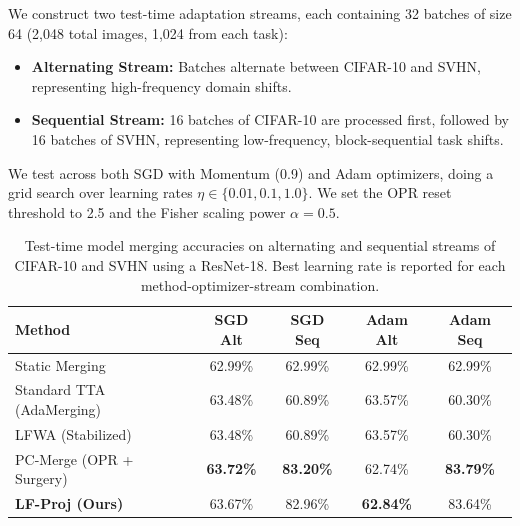 \documentclass{article}
\theoremstyle{plain}
\theoremstyle{definition}
\theoremstyle{remark}
\begin{document}
We construct two test-time adaptation streams, each containing 32 batches of size 64 (2,048 total images, 1,024 from each task):
\begin{itemize}
    \item \textbf{Alternating Stream:} Batches alternate between CIFAR-10 and SVHN, representing high-frequency domain shifts.
    \item \textbf{Sequential Stream:} 16 batches of CIFAR-10 are processed first, followed by 16 batches of SVHN, representing low-frequency, block-sequential task shifts.
\end{itemize}
We test across both SGD with Momentum (0.9) and Adam optimizers, doing a grid search over learning rates $\eta \in \{0.01, 0.1, 1.0\}$. We set the OPR reset threshold to 2.5 and the Fisher scaling power $\alpha = 0.5$.

\begin{table}[t]
\caption{Test-time model merging accuracies on alternating and sequential streams of CIFAR-10 and SVHN using a ResNet-18. Best learning rate is reported for each method-optimizer-stream combination.}
\label{tab:results}
\vskip 0.15in
\begin{center}
\begin{small}
\begin{sc}
\begin{tabular}{lcccc}
\toprule
Method & SGD Alt & SGD Seq & Adam Alt & Adam Seq \\
\midrule
Static Merging & 62.99\% & 62.99\% & 62.99\% & 62.99\% \\
Standard TTA (AdaMerging) & 63.48\% & 60.89\% & 63.57\% & 60.30\% \\
LFWA (Stabilized) & 63.48\% & 60.89\% & 63.57\% & 60.30\% \\
PC-Merge (OPR + Surgery) & \textbf{63.72\%} & \textbf{83.20\%} & 62.74\% & \textbf{83.79\%} \\
\midrule
\textbf{LF-Proj (Ours)} & 63.67\% & 82.96\% & \textbf{62.84\%} & 83.64\% \\
\bottomrule
\end{tabular}
\end{sc}
\end{small}
\end{center}
\vskip -0.1in
\end{table}
\end{document}
